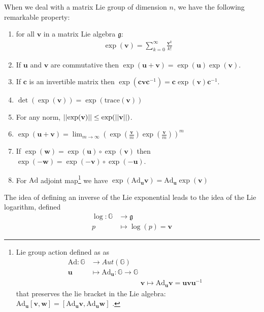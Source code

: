 When we deal with a matrix Lie group of dimension $n$, we have the following remarkable property:
\begin{enumerate}
	\item for all $\mathbf{v}$ in a matrix Lie algebra $\mathfrak{g}$:
	\begin{align*}
	\exp(\mathbf{v}) = \sum_{k=0}^{\infty} \frac{\mathbf{v}^{k}}{k!}
	\end{align*}
	\item If $\mathbf{u}$ and $\mathbf{v}$ are commutative then $\exp(\mathbf{u} + \mathbf{v}) = \exp(\mathbf{u})\exp(\mathbf{v})$.
	\item If $\mathbf{c}$ is an invertible matrix then $\exp(\mathbf{c}\mathbf{v}\mathbf{c}^{-1}) = \mathbf{c}\exp(\mathbf{v})\mathbf{c}^{-1}$.
	\item $\det(\exp(\mathbf{v})) = \exp(\text{trace}(\mathbf{v}))$
	\item For any norm, $\vert\lvert \exp(\mathbf{v}) \rvert\vert \leq \exp(\vert\lvert \mathbf{v} \rvert\vert)$.
	\item  $\exp(\mathbf{u} + \mathbf{v}) =\lim_{m\rightarrow \infty} (\exp(\frac{\mathbf{v}}{m})\exp(\frac{\mathbf{v}}{m}))^{m}$
	\item If $\exp(\mathbf{w}) = \exp(\mathbf{u}) \circ \exp(\mathbf{v})$ then $\exp(\mathbf{-w}) = \exp(\mathbf{-v}) \circ \exp(\mathbf{-u})$.
	\item For $\text{Ad}$ adjoint map\footnote{Lie group action defined as
		as 
		\begin{align*}
		\text{Ad} :  \mathbb{G} & \longrightarrow  Aut(\mathbb{G}) &   \\
		\mathbf{u} &\longmapsto  \text{Ad}_{\mathbf{u}}  : \mathbb{G}  \longrightarrow  \mathbb{G} \\
		& \qquad \qquad \qquad \quad \mathbf{v} \longmapsto \text{Ad}_{\mathbf{u}}\mathbf{v} = \mathbf{u}\mathbf{v}\mathbf{u}^{-1}
		\end{align*}
		that preserves the lie bracket in the Lie algebra: $\text{Ad}_{\mathbf{u}}[\mathbf{v}, \mathbf{w} ] = [\text{Ad}_{\mathbf{u}} \mathbf{v}, \text{Ad}_{\mathbf{u}} \mathbf{w} ]$   .
	} we have $ \exp(\text{Ad}_{\mathbf{u}}\mathbf{v} ) = \text{Ad}_{\mathbf{u}}\exp(\mathbf{v})$
\end{enumerate}
The idea of defining an inverse of the Lie exponential leads to the idea of the Lie logarithm, defined
\begin{align*}
\log : \mathbb{G} & \longrightarrow \mathfrak{g} \\
p &\longmapsto \log (p)  =  \mathbf{v}   
\end{align*}
